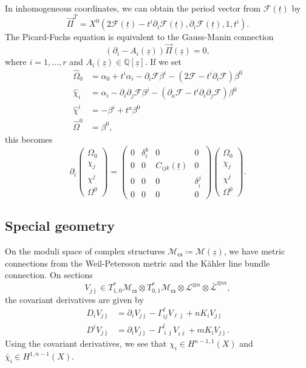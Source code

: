 \documentclass[10pt]{amsart}
\theoremstyle{definition}
\theoremstyle{remark}
\theoremstyle{plain}
\theoremstyle{definition}
\theoremstyle{remark}
\newcommand{\Q}{\mathbb{Q}}
\newcommand{\M}{\mathcal{M}}
\newcommand{\mc}[1]{\mathcal{#1}}
\newcommand{\ut}{\ul{t}}
\newcommand{\uz}{\ul{z}}
\newcommand{\ms}[1]{\mathsf{#1}}
\newcommand{\ul}[1]{\underline{#1}}
\newcommand{\1}{\mathbf{1}}
\newcommand{\2}{\mathbf{2}}
\newcommand{\3}{\mathbf{3}}
\newcommand{\cs}{\ms{cs}}
\begin{document}
In inhomogeneous coordinates, we can obtain the period vector from $\mc{F}(\ut)$ by
\[ \vec{\Pi}^T = X^0 (2 \mc{F}(\ut) - t^i \partial_i \mc{F}(\ut), \partial_i \mc{F}(\ut), 1, t^i). \]
The Picard-Fuchs equation is equivalent to the Gauss-Manin connection
\[ (\partial_i - A_i(\uz)) \vec{\Pi}(\uz) = 0, \]
where $i = 1,\ldots,r$ and $A_i(\uz) \in \Q[\uz]$. If we set
\begin{align*}
    \hat{\Omega}_0 &= \alpha_0 + t^i \alpha_i - \partial_i \mc{F}\beta^i -(2 \mc{F} -t^i \partial_i \mc{F}) \beta^0 \\
    \hat{\chi}_i &= \alpha_i - \partial_i \partial_j \mc{F} \beta^j - (\partial_a \mc{F} - t^i \partial_i \partial_j \mc{F})\beta^0 \\
    \hat{\chi}^i &= -\beta^i + t^a \beta^0 \\
    \hat{\Omega}^0 &= \beta^0,
\end{align*}
this becomes
\[ \partial_i \begin{pmatrix}
    \Omega_0 \\ \chi_j \\ \chi^j \\ \Omega^0
\end{pmatrix} = \begin{pmatrix}
    0 & \delta_i^k & 0 & 0 \\
    0 & 0 & C_{ijk}(\ut) & 0 \\
    0 & 0 & 0 & \delta_i^j \\
    0 & 0 & 0 & 0
\end{pmatrix} \begin{pmatrix}
    \Omega_0 \\ \chi_j \\ \chi^j \\ \Omega^0
\end{pmatrix}.
\]

\subsection{Special geometry}%
\label{sub:Special geometry}

On the moduli space of complex structures $\mc{M}_{\cs} \coloneqq \mc{M}(\uz)$, we have metric connections from the Weil-Petersson metric and the K\"ahler line bundle connection. On sections
\[ V_{j\bar{\jmath}} \in T^*_{1,0}\M_{\cs} \otimes T^*_{0,1}\M_{\cs} \otimes \mc{L}^{\otimes n} \otimes \bar{\mc{L}}^{\otimes m}, \]
the covariant derivatives are given by
\begin{align*}
    D_i V_{j\bar{\jmath}} &= \partial_i V_{j\bar{\jmath}} - \Gamma^{\ell}_{ij} V_{\ell\bar{\jmath}} + n K_i V_{j\bar{\jmath}} \\
    D^i V_{j\bar{\jmath}} &= \partial_{\bar{\imath}} V_{j\bar{\jmath}} - \Gamma^{\bar{\ell}}_{\bar{\imath}\bar{\jmath}} V_{i\bar{\ell}} + m K_{\bar{\imath}} V_{j\bar{\jmath}}.
\end{align*}
Using the covariant derivatives, we see that 
$\chi_i \in H^{n-1,1}(X)$ and $\bar{\chi}_{\bar{\imath}} \in H^{1,n-1}(X)$. 
\end{document}
